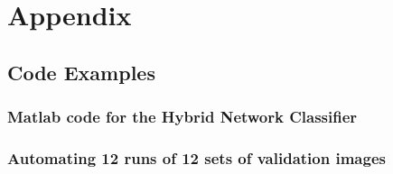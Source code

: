 \chapter{Appendix}

\section{Code Examples}

\subsection{Matlab code for the Hybrid Network Classifier}


\subsection{Automating 12 runs of 12 sets of validation images}


